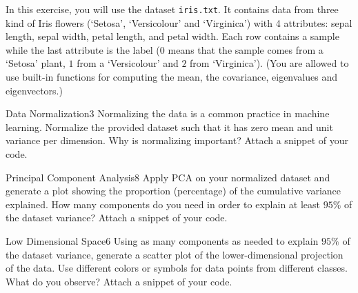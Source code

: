 \newif\ifvimbug
\vimbugfalse

\ifvimbug

\fi

In this exercise, you will use the dataset \texttt{iris.txt}. It contains data from three kind of Iris flowers (`Setosa', `Versicolour' and `Virginica') with 4 attributes: sepal length, sepal width, petal length, and petal width. Each row contains a sample while the last attribute is the label ($0$ means that the sample comes from a `Setosa' plant, $1$ from a `Versicolour' and $2$ from `Virginica').
(You are allowed to use built-in functions for computing the mean, the covariance, eigenvalues and eigenvectors.)

\begin{questions}


\begin{question}{Data Normalization}{3}
Normalizing the data is a common practice in machine learning. Normalize the provided dataset such that it has zero mean and unit variance per dimension. Why is normalizing important?
Attach a snippet of your code. 

\begin{answer}\end{answer}

\end{question}


\begin{question}{Principal Component Analysis}{8}
Apply PCA on your normalized dataset and generate a plot showing the proportion (percentage) of the cumulative variance explained. 
How many components do you need in order to explain at least $95\%$ of the dataset variance? 
Attach a snippet of your code.

\begin{answer}\end{answer}

\end{question}


\begin{question}{Low Dimensional Space}{6}
Using as many components as needed to explain $95\%$ of the dataset variance, generate a scatter plot of the lower-dimensional projection of the data. Use different colors or symbols for data points from different classes. 
What do you observe? Attach a snippet of your code.


\end{question}
\end{questions}
